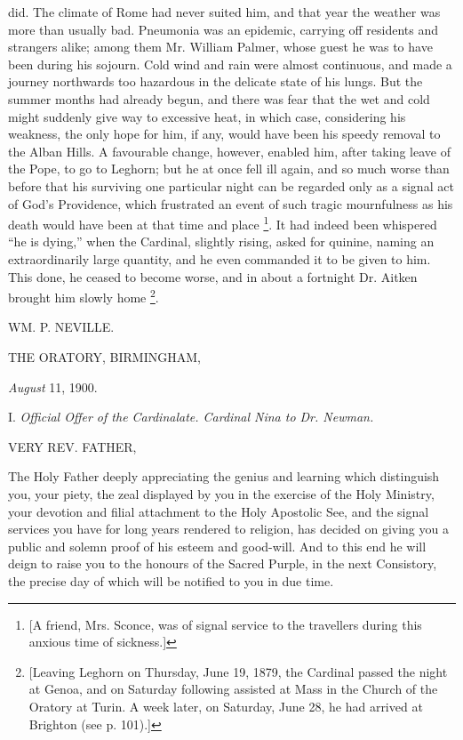 did. The climate of Rome had never suited him, and that year the
weather was more than usually bad. Pneumonia was an epidemic, carrying
off residents and strangers alike; among them Mr. William Palmer,
whose guest he was to have been during his sojourn. Cold wind and rain
were almost continuous, and made a journey northwards too hazardous in
the delicate state of his lungs. But the summer months had already
begun, and there was fear that the wet and cold might suddenly give
way to excessive heat, in which case, considering his weakness, the
only hope for him, if any, would have been his speedy removal to the
Alban Hills. A favourable change, however, enabled him, after taking
leave of the Pope, to go to Leghorn; but he at once fell ill again,
and so much worse than before that his surviving one particular night
can be regarded only as a signal act of God's Providence, which
frustrated an event of such tragic mournfulness as his death would
have been at that time and place \footnote{[A friend, Mrs.
Sconce, was of signal service to the travellers during this anxious
time of sickness.]}. It had indeed been whispered ``he is dying,''
when the Cardinal, slightly rising, asked for quinine, naming an
extraordinarily large quantity, and he even commanded it to be given
to him. This done, he ceased to become worse, and in about a fortnight
Dr. Aitken brought him slowly home \footnote{[Leaving
Leghorn on Thursday, June 19, 1879, the Cardinal passed the night at
Genoa, and on Saturday following assisted at Mass in the Church of the
Oratory at Turin. A week later, on Saturday, June 28, he had arrived
at Brighton (see p. 101).]}.

WM. P. NEVILLE.

THE ORATORY, BIRMINGHAM,

\emph{August} 11, 1900.

I.
\emph{Official Offer of the Cardinalate. Cardinal Nina to Dr. Newman.}

VERY REV. FATHER,

The Holy Father deeply appreciating the genius and learning which
distinguish you, your piety, the zeal displayed by you in the exercise
of the Holy Ministry, your devotion and filial attachment to the Holy
Apostolic See, and the signal services you have for long years
rendered to religion, has decided on giving you a public and solemn
proof of his esteem and good-will. And to this end he will deign to
raise you to the honours of the Sacred Purple, in the next Consistory,
the precise day of which will be notified to you in due time.

